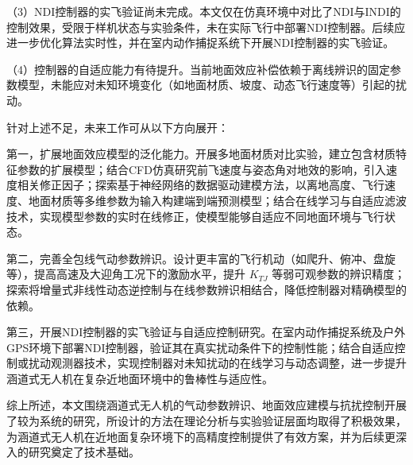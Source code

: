 （3）NDI控制器的实飞验证尚未完成。本文仅在仿真环境中对比了NDI与INDI的控制效果，受限于样机状态与实验条件，未在实际飞行中部署NDI控制器。后续应进一步优化算法实时性，并在室内动作捕捉系统下开展NDI控制器的实飞验证。

（4）控制器的自适应能力有待提升。当前地面效应补偿依赖于离线辨识的固定参数模型，未能应对未知环境变化（如地面材质、坡度、动态飞行速度等）引起的扰动。

针对上述不足，未来工作可从以下方向展开：

第一，扩展地面效应模型的泛化能力。开展多地面材质对比实验，建立包含材质特征参数的扩展模型；结合CFD仿真研究前飞速度与姿态角对地效的影响，引入速度相关修正因子；探索基于神经网络的数据驱动建模方法，以离地高度、飞行速度、地面材质等多维参数为输入构建端到端预测模型；结合在线学习与自适应滤波技术，实现模型参数的实时在线修正，使模型能够自适应不同地面环境与飞行状态。

第二，完善全包线气动参数辨识。设计更丰富的飞行机动（如爬升、俯冲、盘旋等），提高高速及大迎角工况下的激励水平，提升 \(K_{TJ}\) 等弱可观参数的辨识精度；探索将增量式非线性动态逆控制与在线参数辨识相结合，降低控制器对精确模型的依赖。

第三，开展NDI控制器的实飞验证与自适应控制研究。在室内动作捕捉系统及户外GPS环境下部署NDI控制器，验证其在真实扰动条件下的控制性能；结合自适应控制或扰动观测器技术，实现控制器对未知扰动的在线学习与动态调整，进一步提升涵道式无人机在复杂近地面环境中的鲁棒性与适应性。

综上所述，本文围绕涵道式无人机的气动参数辨识、地面效应建模与抗扰控制开展了较为系统的研究，所设计的方法在理论分析与实验验证层面均取得了积极效果，为涵道式无人机在近地面复杂环境下的高精度控制提供了有效方案，并为后续更深入的研究奠定了技术基础。